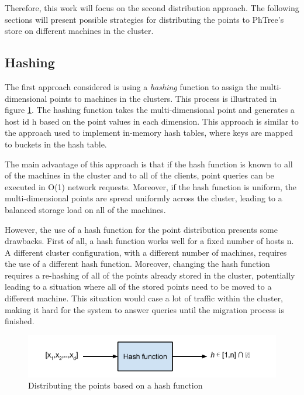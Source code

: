 \documentclass[11pt,a4paper]{globis-book}
\begin{document}
Therefore, this work will focus on the second distribution approach. The following sections will present possible strategies for distributing the points to PhTree's store on different machines in the cluster.  

\subsection{Hashing}

The first approach considered is using a \textit{hashing} function to assign the multi-dimensional points to machines in the clusters. This process is illustrated in figure \ref{fig:hashing}. The hashing function takes the multi-dimensional point and generates a host id h based on the point values in each dimension. This approach is similar to the approach used to implement in-memory hash tables, where keys are mapped to buckets in the hash table.

The main advantage of this approach is that if the hash function is known to all of the machines in the cluster and to all of the clients, point queries can be executed in O(1) network requests. Moreover, if the hash function is uniform, the multi-dimensional points are spread uniformly across the cluster, leading to a balanced storage load on all of the machines.

However, the use of a hash function for the point distribution presents some drawbacks. First of all, a hash function works well for a fixed number of hosts n. A different cluster configuration, with a different number of machines, requires the use of a different hash function. Moreover, changing the hash function requires a re-hashing of all of the points already stored in the cluster, potentially leading to a situation where all of the stored points need to be moved to a different machine. This situation would case a lot of traffic within the cluster, making it hard for the system to answer queries until the migration process is finished.

\begin{figure}[h]
    \centering 
    \includegraphics[scale=0.9]{images/hashing}
    \caption{Distributing the points based on a hash function}
    \label{fig:hashing}
\end{figure}
\end{document}

